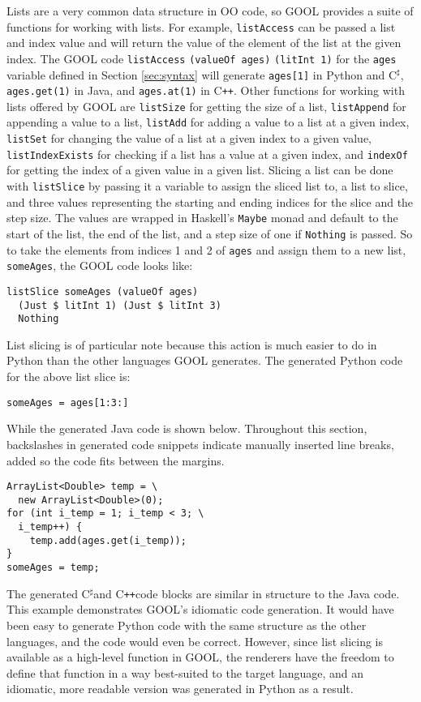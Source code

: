 \documentclass[sigplan,review,anonymous,prologue,dvipsnames]{acmart}
\newcommand{\Csharp}{C$^{\sharp}$}
\newcommand{\Cplusplus}{C\texttt{++}}
\begin{document}
Lists are a very common data structure in OO code, so GOOL provides a suite of
functions for working with lists. For example, \verb|listAccess| can be passed
a list and index value and will return the value of the element of the list at
the given index. The GOOL code \verb|listAccess| \verb|(valueOf ages)|
\verb|(litInt 1)| for the \verb|ages| variable defined in Section \ref{sec:syntax}
will generate \verb|ages[1]| in Python and \Csharp, \verb|ages.get(1)| in Java, and
\verb|ages.at(1)| in \Cplusplus. Other functions for working with lists offered by
GOOL are \verb|listSize| for getting the size of a list, \verb|listAppend| for
appending a value to a list, \verb|listAdd| for adding a value to a list at a
given index, \verb|listSet| for changing the value of a list at a given
index to a given value, \verb|listIndexExists| for checking if a list has a
value at a given index, and \verb|indexOf| for getting the index of a given
value in a given list. Slicing a list can be done with \verb|listSlice| by
passing it a variable to assign the sliced list to, a list to slice, and three
values representing the starting and ending indices for the slice and the step
size. The values are wrapped in Haskell's \verb|Maybe| monad and default to the
start of the list, the end of the list, and a step size of one if
\verb|Nothing| is passed. So to take the elements from indices 1 and 2 of
\verb|ages| and assign them to a new list, \verb|someAges|, the GOOL code looks
like:
\begin{lstlisting}
listSlice someAges (valueOf ages)
  (Just $ litInt 1) (Just $ litInt 3)
  Nothing
\end{lstlisting}
List slicing is of particular note because this action is much easier to do in
Python than the other languages GOOL generates. The generated Python code for
the above list slice is:
\begin{lstlisting}
someAges = ages[1:3:]
\end{lstlisting}
While the generated Java code is shown below. Throughout this section,
backslashes in generated code snippets indicate manually inserted line breaks,
added so the code fits between the margins.
\begin{lstlisting}
ArrayList<Double> temp = \
  new ArrayList<Double>(0);
for (int i_temp = 1; i_temp < 3; \
  i_temp++) {
    temp.add(ages.get(i_temp));
}
someAges = temp;
\end{lstlisting}
The generated \Csharp and \Cplusplus code blocks are similar in structure to the Java
code. This example demonstrates GOOL's idiomatic code generation. It would have
been easy to generate Python code with the same structure as the other
languages, and the code would even be correct. However, since list slicing is
available as a high-level function in GOOL, the renderers have the freedom to
define that function in a way best-suited to the target language, and an
idiomatic, more readable version was generated in Python as a result.
\end{document}

